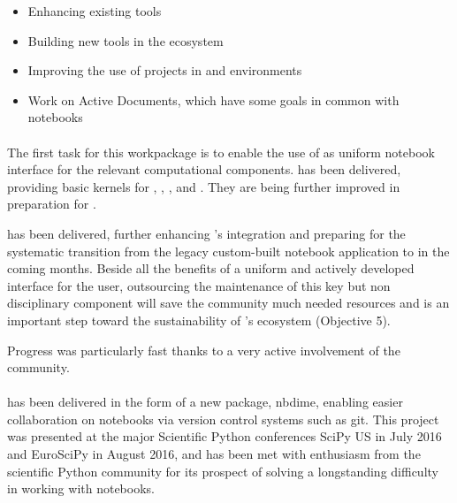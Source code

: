 \documentclass{deliverablereport}
\begin{document}
\begin{itemize}
    \item Enhancing existing \Jupyter tools
    \item Building new tools in the \Jupyter ecosystem
    \item Improving the use of \ODK projects %
      in \Jupyter and \Sage environments
    \item Work on Active Documents, which have some goals in common with \Jupyter notebooks
\end{itemize}


\paragraph{}

The first task for this workpackage is to enable the use of \Jupyter
as uniform notebook interface for the relevant computational
components.  has been delivered,
providing basic \Jupyter kernels for \GAP, \Pari, \Sage, and
\Singular. They are being further improved in preparation for
.

 has been delivered, further
enhancing \Sage's \Jupyter integration and preparing for the
systematic transition from the legacy custom-built \Sage notebook
application to \Jupyter in the coming months. Beside all the benefits
of a uniform and actively developed interface for the user,
outsourcing the maintenance of this key but non disciplinary component
will save the \Sage community much needed resources and is an
important step toward the sustainability of \ODK's ecosystem
(Objective 5).

Progress was particularly fast thanks to a very active involvement of
the \Sage community.



\paragraph{}

 has been delivered in the form of a new \Jupyter package, nbdime,
enabling easier collaboration on notebooks via version control systems such as git. This project
was presented at the major Scientific Python conferences SciPy US in July 2016 and EuroSciPy in August 2016,
and has been met with enthusiasm from the scientific Python community for its prospect of solving a
longstanding difficulty in working with notebooks.
\end{document}
